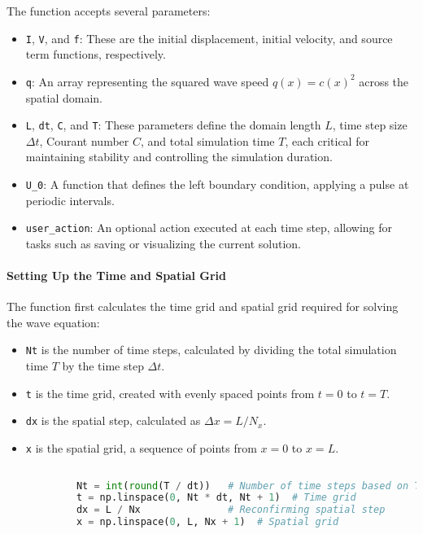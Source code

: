 \documentclass{article}
\begin{document}
		The function accepts several parameters:
		\begin{itemize}
			\item \texttt{I}, \texttt{V}, and \texttt{f}: These are the initial displacement, initial velocity, and source term functions, respectively.
			\item \texttt{q}: An array representing the squared wave speed \( q(x) = c(x)^2 \) across the spatial domain.
			\item \texttt{L}, \texttt{dt}, \texttt{C}, and \texttt{T}: These parameters define the domain length \( L \), time step size \( \Delta t \), Courant number \( C \), and total simulation time \( T \), each critical for maintaining stability and controlling the simulation duration.
			\item \texttt{U\_0}: A function that defines the left boundary condition, applying a pulse at periodic intervals.
			\item \texttt{user\_action}: An optional action executed at each time step, allowing for tasks such as saving or visualizing the current solution.
		\end{itemize}
		
		\paragraph{Setting Up the Time and Spatial Grid}
		
		The function first calculates the time grid and spatial grid required for solving the wave equation:
		\begin{itemize}
			\item \texttt{Nt} is the number of time steps, calculated by dividing the total simulation time \( T \) by the time step \( \Delta t \).
			\item \texttt{t} is the time grid, created with evenly spaced points from \( t = 0 \) to \( t = T \).
			\item \texttt{dx} is the spatial step, calculated as \( \Delta x = L / N_x \).
			\item \texttt{x} is the spatial grid, a sequence of points from \( x = 0 \) to \( x = L \).
		\end{itemize}
		
		\begin{lstlisting}[language=Python]
			
			Nt = int(round(T / dt))   # Number of time steps based on T and dt
			t = np.linspace(0, Nt * dt, Nt + 1)  # Time grid
			dx = L / Nx               # Reconfirming spatial step
			x = np.linspace(0, L, Nx + 1)  # Spatial grid
		\end{lstlisting}
		
\end{document}
